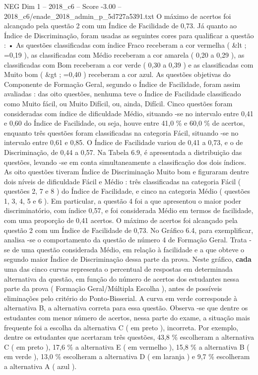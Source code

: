 \begin{textsample}{NEG Dim 1 – 2018\_c6 – Score -3.00 – 2018\_c6/enade\_2018\_admin\_p\_5d727a5391.txt}
O máximo de acertos foi alcançado pela questão 2 com um Índice de Facilidade de 0,73.
Já quanto ao Índice de Discriminação, foram usadas as seguintes cores para qualificar a questão : • As questões classificadas com índice Fraco receberam a cor vermelha ( \&lt ; =0,19 ), as classificadas com Médio receberam a cor amarela ( 0,20 a 0,29 ), as classificadas com Bom receberam a cor verde ( 0,30 a 0,39 ) e as classificadas com Muito bom ( \&gt ; =0,40 ) receberam a cor azul.
As questões objetivas do Componente de Formação Geral, segundo o Índice de Facilidade, foram assim avaliadas : das oito questões, nenhuma teve o Índice de Facilidade classificado como Muito fácil, ou Muito Difícil, ou, ainda, Difícil.
Cinco questões foram consideradas com índice de dificuldade Médio, situando -se no intervalo entre 0,41 e 0,60 do Índice de Facilidade, ou seja, houve entre 41,0 \% e 60,0 \% de acertos, enquanto três questões foram classificadas na categoria Fácil, situando -se no intervalo entre 0,61 e 0,85.
O Índice de Facilidade variou de 0,41 a 0,73, e o de Discriminação, de 0,44 a 0,57.
Na Tabela 6.9, é apresentada a distribuição das questões, levando -se em conta simultaneamente a classificação dos dois índices.
As oito questões tiveram Índice de Discriminação Muito bom e figuraram dentre dois níveis de dificuldade Fácil e Médio : três classificadas na categoria Fácil ( questões 2, 7 e 8 ) do Índice de Facilidade, e cinco na categoria Médio ( questões 1, 3, 4, 5 e 6 ).
Em particular, a questão 4 foi a que apresentou o maior poder discriminatório, com índice 0,57, e foi considerada Médio em termos de facilidade, com uma proporção de 0,41 acertos.
O máximo de acertos foi alcançado pela questão 2 com um Índice de Facilidade de 0,73.
No Gráfico 6.4, para exemplificar, analisa -se o comportamento da questão de número 4 de Formação Geral.
Trata -se de uma questão considerada Médio, em relação à facilidade e a que obteve o segundo maior Índice de Discriminação dessa parte da prova.
Neste gráfico, \textbf{cada} uma das cinco curvas representa o percentual de respostas em determinada alternativa da questão, em função do número de acertos dos estudantes nessa parte da prova ( Formação Geral/Múltipla Escolha ), antes de possíveis eliminações pelo critério do Ponto-Bisserial.
A curva em verde corresponde à alternativa B, a alternativa correta para essa questão.
Observa -se que dentre os estudantes com menor número de acertos, nessa parte do exame, a situação mais frequente foi a escolha da alternativa C ( em preto ), incorreta.
Por exemplo, dentre os estudantes que acertaram três questões, 43,8 \% escolheram a alternativa C ( em preto ), 17,6 \% a alternativa E ( em vermelho ), 15,8 \% a alternativa B ( em verde ), 13,0 \% escolheram a alternativa D ( em laranja ) e 9,7 \% escolheram a alternativa A ( azul ).

\end{textsample}
